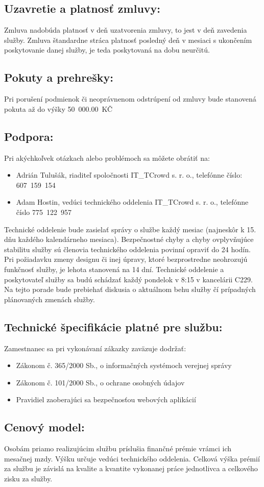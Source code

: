 \documentclass[a4paper, 11pt]{article}
\begin{document}
\begin{center}
\subsection*{Uzavretie a platnosť zmluvy:}
Zmluva nadobúda platnosť v deň uzatvorenia zmluvy, to jest v deň zavedenia služby. Zmluva štandardne stráca platnosť posledný deň v mesiaci s ukončením poskytovanie danej služby, je teda poskytovaná na dobu neurčitú. 

\subsection*{Pokuty a prehrešky:}
Pri porušení podmienok či neoprávnenom odstrúpení od zmluvy bude stanovená pokuta až do výšky 50~000.00~KČ

\subsection*{Podpora:}
Pri akýchkoľvek otázkach alebo problémoch sa môžete obrátiť na:
\begin{itemize}
\item Adrián Tulušák, riaditeľ spoločnosti IT\_TCrowd s. r. o., telefónne číslo: 607~159~154
\item Adam Hostin, vedúci technického oddelenia IT\_TCrowd s. r. o., telefónne číslo 775~122~957
\end{itemize}
Technické oddelenie bude zasielať správy o službe každý mesiac (najneskôr k 15. dňu každého kalendárneho mesiaca). Bezpečnostné chyby a chyby ovplyvňujúce stabilitu služby sú členovia technického oddelenia povinní opraviť do 24 hodín. Pri požiadavku zmeny designu či inej úpravy, ktoré bezprostredne neohrozujú funkčnosť služby, je lehota stanovená na 14 dní. Technické oddelenie a poskytovateľ služby sa budú schádzať každý pondelok v 8:15 v kancelárii C229. Na tejto porade bude prebiehať diskusia o aktuálnom behu služby čí prípadných plánovaných zmenách služby.

\subsection*{Technické špecifikácie platné pre službu:}
Zamestnanec sa pri vykonávaní zákazky zaväzuje dodržať:
\begin{itemize}
\item Zákonom č. 365/2000 Sb., o informačných systémoch verejnej správy
\item Zákonom č. 101/2000 Sb., o ochrane osobných údajov
\item Pravidiel zaoberajúci sa bezpečnosťou webových aplikácií
\end{itemize}

\subsection*{Cenový model:}
Osobám priamo realizujúcim službu príslušia finančné prémie vrámci ich mesačnej mzdy. Výšku určuje vedúci technického oddelenia. Celková výška prémií za službu je závislá na kvalite a kvantite vykonanej práce jednotlivca a celkového zisku za služby.

\end{center}
\end{document}
